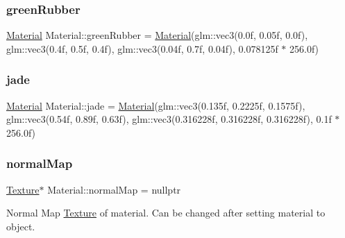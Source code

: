 \mbox{\label{struct_material_aab6e7659ecff08471027e084046cafe4}} 
\subsubsection{\texorpdfstring{greenRubber}{greenRubber}}
{\footnotesize\ttfamily \mbox{\hyperlink{struct_material}{Material}} Material\+::green\+Rubber = \mbox{\hyperlink{struct_material}{Material}}(glm\+::vec3(0.\+0f, 0.\+05f, 0.\+0f), glm\+::vec3(0.\+4f, 0.\+5f, 0.\+4f), glm\+::vec3(0.\+04f, 0.\+7f, 0.\+04f), 0.\+078125f $\ast$ 256.\+0f)\hspace{0.3cm}{\ttfamily [static]}}

\mbox{\label{struct_material_ab321b1fd760849c28860768bc08c3719}} 
\subsubsection{\texorpdfstring{jade}{jade}}
{\footnotesize\ttfamily \mbox{\hyperlink{struct_material}{Material}} Material\+::jade = \mbox{\hyperlink{struct_material}{Material}}(glm\+::vec3(0.\+135f, 0.\+2225f, 0.\+1575f), glm\+::vec3(0.\+54f, 0.\+89f, 0.\+63f), glm\+::vec3(0.\+316228f, 0.\+316228f, 0.\+316228f), 0.\+1f $\ast$ 256.\+0f)\hspace{0.3cm}{\ttfamily [static]}}

\mbox{\label{struct_material_a915ba1f28243cdd67be5ccc70d4073d8}} 
\subsubsection{\texorpdfstring{normalMap}{normalMap}}
{\footnotesize\ttfamily \mbox{\hyperlink{class_texture}{Texture}}$\ast$ Material\+::normal\+Map = nullptr}



Normal Map \mbox{\hyperlink{class_texture}{Texture}} of material. Can be changed after setting material to object. 

\mbox{\label{struct_material_aa189bbbd916aaf6a451296e2ffc6a47c}} 
